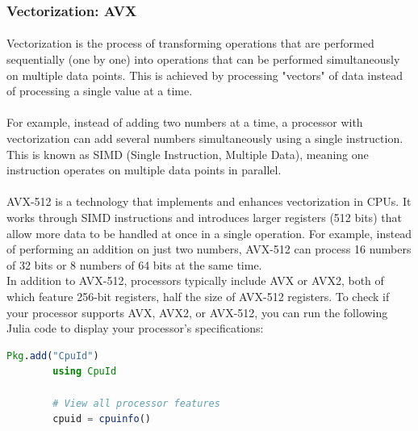 \subsubsection{Vectorization: AVX}

    \paragraph*{}
    Vectorization is the process of transforming operations that are performed sequentially (one by one) into operations that can be 
    performed simultaneously on multiple data points. This is achieved by processing "vectors" of data instead of processing a single 
    value at a time.
    \par

    \paragraph*{}
    For example, instead of adding two numbers at a time, a processor with vectorization can add several numbers simultaneously using 
    a single instruction. This is known as SIMD (Single Instruction, Multiple Data), meaning one instruction operates on multiple data 
    points in parallel.
    \par

    \paragraph*{}
    AVX-512 is a technology that implements and enhances vectorization in CPUs. It works through SIMD instructions and introduces larger registers 
    (512 bits) that allow more data to be handled at once in a single operation. For example, instead of performing an addition 
    on just two numbers, AVX-512 can process 16 numbers of 32 bits or 8 numbers of 64 bits at the same time.
    \\
    In addition to AVX-512, processors typically include AVX or AVX2, both of which feature 256-bit registers, half the size of 
    AVX-512 registers. To check if your processor supports AVX, AVX2, or AVX-512, you can run the following Julia code to display 
    your processor’s specifications:
    \\
    \begin{lstlisting}[language=Julia]
        Pkg.add("CpuId")
        using CpuId

        # View all processor features
        cpuid = cpuinfo()
    \end{lstlisting}
    \vspace{0.5cm}
    
